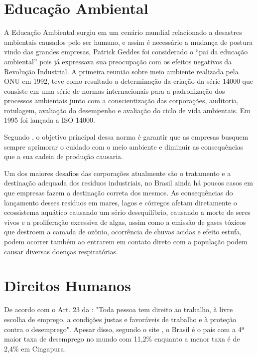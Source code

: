 \documentclass[12pt,oneside,a4paper,chapter=TITLE,section=TITLE,sumario
=tradicional]{abntex2}
\begin{document}
\vspace{1em}
\chapter{Educação Ambiental}
\label{cap:educacao-ambiental}

A Educação Ambiental surgiu em um cenário mundial relacionado a desastres ambientais causados pelo ser humano, e assim é necessário a mudança de postura vindo das grandes empresas, Patrick Geddes foi considerado o “pai da educação ambiental” pois já expressava sua preocupação com os efeitos negativos da Revolução Industrial. A primeira reunião sobre meio ambiente realizada pela ONU em 1992, teve como resultado a determinação da criação da série 14000 que consiste em uma série de normas internacionais para a padronização dos processos ambientais junto com a conscientização das corporações, auditoria, rotulagem, avaliação do desempenho e avaliação do ciclo de vida ambientais. Em 1995 foi lançada a ISO 14000.

Segundo , o objetivo principal dessa norma é garantir que as empresas busquem sempre aprimorar o cuidado com o meio ambiente e diminuir as consequências que a sua cadeia de produção causaria.

Um dos maiores desafios das corporações atualmente são o tratamento e a destinação adequada dos resíduos industriais, no Brasil ainda há poucos casos em que empresas fazem a destinação correta dos mesmos. As consequências do lançamento desses resíduos em mares, lagos e córregos afetam diretamente o ecossistema aquático causando um sério desequilíbrio, causando a morte de seres vivos e a proliferação excessiva de algas, assim como a emissão de gases tóxicos que destroem a camada de ozônio,  ocorrência de chuvas acidas e efeito estufa, podem ocorrer também ao entrarem em contato direto com a população podem causar diversas doenças respiratórias.
\chapter{Direitos Humanos}
\label{cap:direitos-humanos}

De acordo com o Art. 23 da : "Toda pessoa tem
direito ao trabalho, à livre escolha de emprego, a condições justas e favoráveis de
trabalho e à proteção contra o desemprego". Apesar disso, segundo o site , o Brasil é o país com a 4ª maior taxa de desemprego no mundo com 11,2\%
enquanto a menor taxa é de 2,4\% em Cingapura. 
\end{document}
